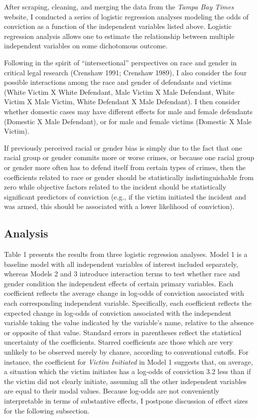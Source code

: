 \documentclass[12pt,article]{article}
\begin{document}
After scraping, cleaning, and merging the data from the \emph{Tampa Bay
Times} website, I conducted a series of logistic regression analyses
modeling the odds of conviction as a function of the independent
variables listed above. Logistic regression analysis allows one to
estimate the relationship between multiple independent variables on some
dichotomous outcome.

Following in the spirit of ``intersectional'' perspectives on race and
gender in critical legal research (Crenshaw 1991; Crenshaw 1989), I also
consider the four possible interactions among the race and gender of
defendants and victims (White Victim X White Defendant, Male Victim X
Male Defendant, White Victim X Male Victim, White Defendant X Male
Defendant). I then consider whether domestic cases may have different
effects for male and female defendants (Domestic X Male Defendant), or
for male and female victims (Domestic X Male Victim).

If previously perceived racial or gender bias is simply due to the fact
that one racial group or gender commits more or worse crimes, or because
one racial group or gender more often has to defend itself from certain
types of crimes, then the coefficients related to race or gender should
be statistically indistinguishable from zero while objective factors
related to the incident should be statistically significant predictors
of conviction (e.g., if the victim initiated the incident and was armed,
this should be associated with a lower likelihood of conviction).

\subsection{Analysis}\label{analysis}

Table 1 presents the results from three logistic regression analyses.
Model 1 is a baseline model with all independent variables of interest
included separately, whereas Models 2 and 3 introduce interaction terms
to test whether race and gender condition the independent effects of
certain primary variables. Each coefficient reflects the average change
in log-odds of conviction associated with each corresponding independent
variable. Specifically, each coefficient reflects the expected change in
log-odds of conviction associated with the independent variable taking
the value indicated by the variable's name, relative to the absence or
opposite of that value. Standard errors in parentheses reflect the
statistical uncertainty of the coefficients. Starred coefficients are
those which are very unlikely to be observed merely by chance, according
to conventional cutoffs. For instance, the coefficient for \emph{Victim
Initiated} in Model 1 suggests that, on average, a situation which the
victim initiates has a log-odds of conviction 3.2 less than if the
victim did not clearly initiate, assuming all the other independent
variables are equal to their modal values. Because log-odds are not
conveniently interpretable in terms of substantive effects, I postpone
discussion of effect sizes for the following subsection.
\end{document}
